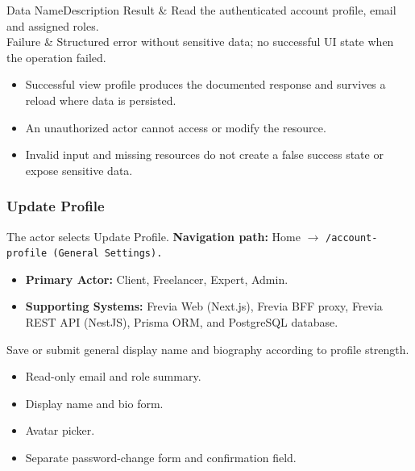 \begin{specdatatable}{Data Name}{Description}
Result & Read the authenticated account profile, email and assigned roles.\\ \hline
Failure & Structured error without sensitive data; no successful UI state when the operation failed.\\ \hline
\end{specdatatable}

\begin{itemize}[leftmargin=1.6em,topsep=3pt,itemsep=2pt,parsep=0pt,label=$\bullet$]
    \item Successful view profile produces the documented response and survives a reload where data is persisted.
    \item An unauthorized actor cannot access or modify the resource.
    \item Invalid input and missing resources do not create a false success state or expose sensitive data.
\end{itemize}

\subsubsection{Update Profile}

The actor selects Update Profile.\newline
\textbf{Navigation path:} Home $\rightarrow$ \texttt{/\allowbreak{}account-\allowbreak{}profile (General Settings).}


\begin{itemize}[leftmargin=1.6em,topsep=3pt,itemsep=2pt,parsep=0pt,label=$\bullet$]
    \item \textbf{Primary Actor:} Client, Freelancer, Expert, Admin.
    \item \textbf{Supporting Systems:} Frevia Web (Next.js), Frevia BFF proxy, Frevia REST API (NestJS), Prisma ORM, and PostgreSQL database.
\end{itemize}

\noindent Save or submit general display name and biography according to profile strength.

\begin{itemize}[leftmargin=1.6em,topsep=3pt,itemsep=2pt,parsep=0pt,label=$\bullet$]
    \item Read-only email and role summary.
    \item Display name and bio form.
    \item Avatar picker.
    \item Separate password-change form and confirmation field.
\end{itemize}

